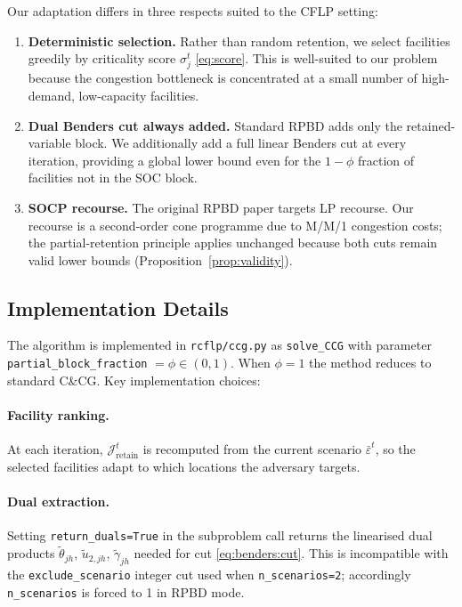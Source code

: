 Our adaptation differs in three respects suited to the CFLP setting:
\begin{enumerate}
  \item \textbf{Deterministic selection.}
        Rather than random retention, we select facilities
        greedily by criticality score $\sigma_j^t$
        \eqref{eq:score}. This is well-suited to our problem
        because the congestion bottleneck is concentrated at a
        small number of high-demand, low-capacity facilities.
  \item \textbf{Dual Benders cut always added.}
        Standard RPBD adds only the retained-variable block.
        We additionally add a full linear Benders cut at every
        iteration, providing a global lower bound even for the
        $1-\phi$ fraction of facilities not in the SOC block.
  \item \textbf{SOCP recourse.}
        The original RPBD paper targets LP recourse.
        Our recourse is a second-order cone programme due to M/M/1
        congestion costs; the partial-retention principle applies
        unchanged because both cuts remain valid lower bounds
        (Proposition~\ref{prop:validity}).
\end{enumerate}

\subsection{Implementation Details}
\label{sec:rpbd:impl}

The algorithm is implemented in \texttt{rcflp/ccg.py} as
\texttt{solve\_CCG} with parameter
\texttt{partial\_block\_fraction} $= \phi \in (0,1)$.
When $\phi = 1$ the method reduces to standard C\&CG\@.
Key implementation choices:

\paragraph{Facility ranking.}
At each iteration, $\mathcal{J}^t_{\mathrm{retain}}$ is recomputed
from the current scenario $\bar\varepsilon^t$, so the selected
facilities adapt to which locations the adversary targets.

\paragraph{Dual extraction.}
Setting \texttt{return\_duals=True} in the subproblem call returns
the linearised dual products $\tilde\theta_{jh}$, $\tilde u_{2,jh}$,
$\tilde\gamma_{jh}$ needed for cut \eqref{eq:benders:cut}.
This is incompatible with the \texttt{exclude\_scenario} integer cut
used when \texttt{n\_scenarios=2}; accordingly \texttt{n\_scenarios}
is forced to 1 in RPBD mode.

